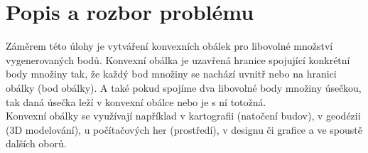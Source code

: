\documentclass[a4paper,11pt,twoside]{article}
\begin{document}



\renewcommand{\baselinestretch}{1.4} %
\newpage
\tableofcontents %

\newpage
\listoffigures %

\thispagestyle{empty}
\newcommand{\obrazek}[1]{(viz obr. \ref{#1})} %

\newpage
\pagestyle{fancy}


\renewcommand{\baselinestretch}{1.4} %

\renewcommand{\sectionmark}[1]{\markright{\ #1}}

\fancyhf{} %
\renewcommand{\headrulewidth}{0.4pt} %
\renewcommand{\footrulewidth}{0.4pt}  %
\addtolength{\voffset}{-0.4cm}

\fancyhead[RE, RO]{\nouppercase{\rightmark}}
   
\fancyfoot[RO, LE]{{\textsc{\small \thepage}}}

\fancypagestyle{plain}{
  \fancyhead{} %
  \renewcommand{\headrulewidth}{0pt} %
}



\newpage
\pagestyle{fancy}

\vspace*{-1cm}
\section{Popis a rozbor problému}
\noindent
\large
Záměrem této úlohy je vytváření konvexních obálek pro libovolné množství vygenerovaných bodů. Konvexní obálka je uzavřená hranice spojující konkrétní body množiny tak, že každý bod množiny se nachází uvnitř nebo na hranici obálky (bod obálky). A také pokud spojíme dva libovolné body množiny úsečkou, tak daná úsečka leží v konvexní obálce nebo je s ní totožná. \\
\indent Konvexní obálky se využívají například v kartografii (natočení budov), v geodézii (3D modelování), u počítačových her (prostředí), v designu či grafice a ve spoustě dalších oborů.
\end{document}
